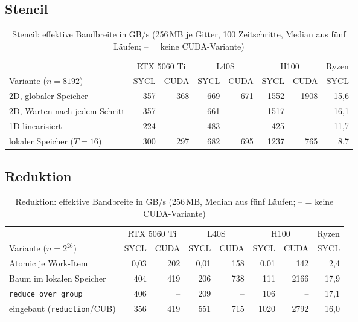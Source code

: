 \documentclass[12pt,a4paper]{article}
\begin{document}
\subsection{Stencil}\label{sec:a-stencil}

\begin{table}[H]
\centering
\footnotesize
\setlength{\tabcolsep}{4pt}
\caption[Stencil: effektive Bandbreite (GB/s)]{Stencil: effektive Bandbreite in GB/s (256\,MB je Gitter, 100 Zeitschritte, Median aus fünf Läufen; -- = keine CUDA-Variante)}
\label{tab:stencil}
\begin{tabular}{@{}l*{7}{r}@{}}
\toprule
 & \multicolumn{2}{c}{RTX 5060 Ti} & \multicolumn{2}{c}{L40S} & \multicolumn{2}{c}{H100} & Ryzen \\
\cmidrule(lr){2-3}\cmidrule(lr){4-5}\cmidrule(lr){6-7}\cmidrule(l){8-8}
Variante ($n = 8192$) & SYCL & CUDA & SYCL & CUDA & SYCL & CUDA & SYCL \\
\midrule
2D, globaler Speicher          & 357  & 368  & 669  & 671  & 1552 & 1908 & 15,6 \\
2D, Warten nach jedem Schritt  & 357  & --   & 661  & --   & 1517 & --   & 16,1 \\
1D linearisiert                & 224  & --   & 483  & --   & 425  & --   & 11,7 \\
lokaler Speicher ($T = 16$)    & 300  & 297  & 682  & 695  & 1237 & 765  & 8,7  \\
\bottomrule
\end{tabular}
\end{table}

\subsection{Reduktion}\label{sec:a-reduktion}

\begin{table}[H]
\centering
\footnotesize
\setlength{\tabcolsep}{4pt}
\caption[Reduktion: effektive Bandbreite (GB/s)]{Reduktion: effektive Bandbreite in GB/s (256\,MB, Median aus fünf Läufen; -- = keine CUDA-Variante)}
\label{tab:reduktion}
\begin{tabular}{@{}l*{7}{r}@{}}
\toprule
 & \multicolumn{2}{c}{RTX 5060 Ti} & \multicolumn{2}{c}{L40S} & \multicolumn{2}{c}{H100} & Ryzen \\
\cmidrule(lr){2-3}\cmidrule(lr){4-5}\cmidrule(lr){6-7}\cmidrule(l){8-8}
Variante ($n = 2^{26}$) & SYCL & CUDA & SYCL & CUDA & SYCL & CUDA & SYCL \\
\midrule
Atomic je Work-Item                  & 0,03 & 202  & 0,01 & 158  & 0,01 & 142  & 2,4  \\
Baum im lokalen Speicher             & 404  & 419  & 206  & 738  & 111  & 2166 & 17,9 \\
\texttt{reduce\_over\_group}         & 406  & --   & 209  & --   & 106  & --   & 17,1 \\
eingebaut (\texttt{reduction}/CUB)   & 356  & 419  & 551  & 715  & 1020 & 2792 & 16,0 \\
\bottomrule
\end{tabular}
\end{table}
\end{document}
